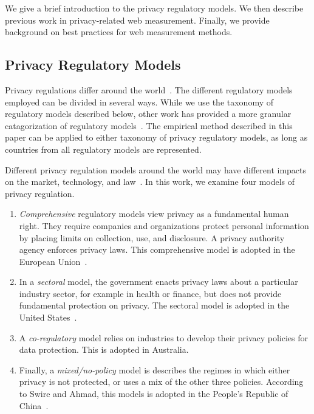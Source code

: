 \documentclass[conference]{IEEEtran}
\begin{document}
We give a brief introduction to the privacy regulatory models.  We then describe previous work in privacy-related web measurement. Finally, we provide background on best practices for web measurement methods.

\subsection{Privacy Regulatory Models}
Privacy regulations differ around the world~\cite{flaherty1992protecting,madsen1992handbook}. The different regulatory models employed can be divided in several ways.  While we use the taxonomy of regulatory models described below, other work has provided a more granular catagorization of regulatory models~\cite{Milberg:1995:VPI:219663.219683, madsen1992handbook}.  The empirical method described in this paper can be applied to either taxonomy of privacy regulatory models, as long as countries from all regulatory models are represented.

Different privacy regulation models around the world may have different impacts on the market, technology, and law~\cite{IAPPbook}. In this work, we examine four models of privacy regulation. 
\begin{enumerate}
	\item \emph{Comprehensive} regulatory models view privacy as a fundamental human right.  They require companies and organizations protect personal information by placing limits on collection, use, and disclosure. A privacy authority agency enforces privacy laws.  This comprehensive model is adopted in the European Union~\cite{IAPPbook}.  
	\item In a \emph{sectoral} model, the government enacts privacy laws about a particular industry sector, for example in health or finance, but does not provide fundamental protection on privacy.  The sectoral model is adopted in the United States~\cite{solove2006model}. 
	\item A \emph{co-regulatory} model relies on industries to develop their privacy policies for data protection.  This is adopted in Australia. 
	\item Finally, a \emph{mixed/no-policy} model is describes the regimes in which either privacy is not protected, or uses a mix of the other three policies.  According to Swire and Ahmad, this models is adopted in the People's Republic of China~\cite{IAPPbook}. 
\end{enumerate}
\end{document}
